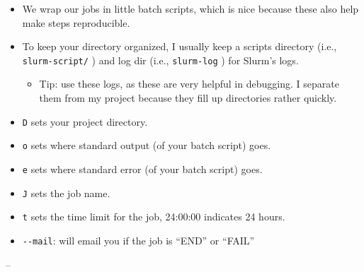 \documentclass[]{article}
\providecommand{\tightlist}{%
  \setlength{\itemsep}{0pt}\setlength{\parskip}{0pt}}
\begin{document}
\begin{itemize}
\item
  We wrap our jobs in little batch scripts, which is nice because these
  also help make steps reproducible.
\item
  To keep your directory organized, I usually keep a scripts directory
  (i.e., \texttt{slurm-script/} ) and log dir (i.e., \texttt{slurm-log}
  ) for Slurm's logs.

  \begin{itemize}
  \tightlist
  \item
    Tip: use these logs, as these are very helpful in debugging. I
    separate them from my project because they fill up directories
    rather quickly.
  \end{itemize}
\item
  \texttt{D} sets your project directory.
\item
  \texttt{o} sets where standard output (of your batch script) goes.
\item
  \texttt{e} sets where standard error (of your batch script) goes.
\item
  \texttt{J} sets the job name.
\item
  \texttt{t} sets the time limit for the job, 24:00:00 indicates 24
  hours.
\item
  \texttt{-\/-mail}: will email you if the job is ``END'' or ``FAIL''
\end{itemize}

--
\end{document}
